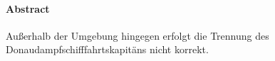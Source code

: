 

\begin{center}
\paragraph{Abstract}
\hrulefill
\end{center}
Außerhalb der Umgebung hingegen erfolgt die Trennung des Donaudampfschifffahrtskapitäns nicht korrekt.

